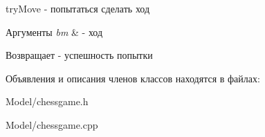 try\+Move -\/ попытаться сделать ход 


\begin{DoxyParams}{Аргументы}
{\em bm} & -\/ ход \\
\hline
\end{DoxyParams}
\begin{DoxyReturn}{Возвращает}
-\/ успешность попытки 
\end{DoxyReturn}


Объявления и описания членов классов находятся в файлах\+:\begin{DoxyCompactItemize}
\item 
Model/chessgame.\+h\item 
Model/chessgame.\+cpp\end{DoxyCompactItemize}
